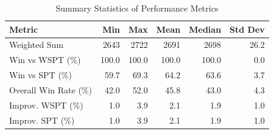 \begin{table}[htbp]%
\centering%
\begin{tabular}{lrrrrr}%
\toprule%
\textbf{Metric}&\textbf{Min}&\textbf{Max}&\textbf{Mean}&\textbf{Median}&\textbf{Std Dev}\\%
\midrule%
Weighted Sum&2643&2722&2691&2698&26.2\\%
Win vs WSPT (\%)&100.0&100.0&100.0&100.0&0.0\\%
Win vs SPT (\%)&59.7&69.3&64.2&63.6&3.7\\%
Overall Win Rate (\%)&42.0&52.0&45.8&43.0&4.3\\%
Improv. WSPT (\%)&1.0&3.9&2.1&1.9&1.0\\%
Improv. SPT (\%)&1.0&3.9&2.1&1.9&1.0\\%
\bottomrule%
\end{tabular}%
\caption{Summary Statistics of Performance Metrics}%
\label{tab:metrics}%
\end{table}